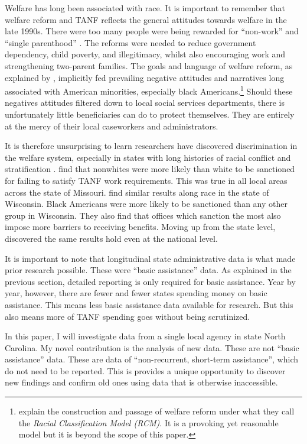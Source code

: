 \documentclass[12pt,letterpaperpaper,]{book}
\begin{document}
Welfare has long been associated with race. It is important to remember
that welfare reform and TANF reflects the general attitudes towards
welfare in the late 1990s. There were too many people were being
rewarded for ``non-work'' and ``single parenthood''
\citep{rector_continuing_2003}. The reforms were needed to reduce
government dependency, child poverty, and illegitimacy, whilst also
encouraging work and strengthening two-parent families. The goals and
language of welfare reform, as explained by
\citet{soss_disciplining_2011}, implicitly fed prevailing negative
attitudes and narratives long associated with American minorities,
especially black Americans.\footnote{\citet{soss_color_2008} explain the
  construction and passage of welfare reform under what they call the
  \emph{Racial Classification Model (RCM)}. It is a provoking yet
  reasonable model but it is beyond the scope of this paper.} Should
these negatives attitudes filtered down to local social services
departments, there is unfortunately little beneficiaries can do to
protect themselves. They are entirely at the mercy of their local
caseworkers and administrators.

It is therefore unsurprising to learn researchers have discovered
discrimination in the welfare system, especially in states with long
histories of racial conflict and stratification
\citep{mannix_tanf_2013}. \citet{keiser_race_2004} find that nonwhites
were more likely than white to be sanctioned for failing to satisfy TANF
work requirements. This was true in all local areas across the state of
Missouri. \citet{wu_how_2006} find similar results along race in the
state of Wisconsin. Black Americans were more likely to be sanctioned
than any other group in Wisconsin. They also find that offices which
sanction the most also impose more barriers to receiving benefits.
Moving up from the state level, \citet{monnat_color_2010} discovered the
same results hold even at the national level.

It is important to note that longitudinal state administrative data is
what made prior research possible. These were ``basic assistance'' data.
As explained in the previous section, detailed reporting is only
required for basic assistance. Year by year, however, there are fewer
and fewer states spending money on basic assistance. This means less
basic assistance data available for research. But this also means more
of TANF spending goes without being scrutinized.

In this paper, I will investigate data from a single local agency in
state North Carolina. My novel contribution is the analysis of new data.
These are not ``basic assistance'' data. These are data of
``non-recurrent, short-term assistance'', which do not need to be
reported. This is provides a unique opportunity to discover new findings
and confirm old ones using data that is otherwise inaccessible.
\end{document}
